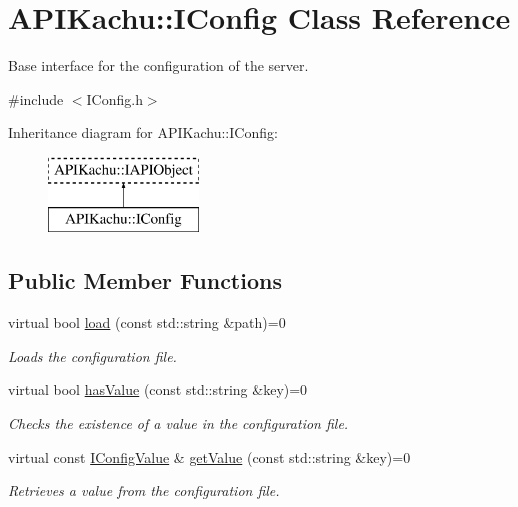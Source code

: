 \hypertarget{class_a_p_i_kachu_1_1_i_config}{}\section{A\+P\+I\+Kachu\+:\+:I\+Config Class Reference}
\label{class_a_p_i_kachu_1_1_i_config}


Base interface for the configuration of the server.  




{\ttfamily \#include $<$I\+Config.\+h$>$}

Inheritance diagram for A\+P\+I\+Kachu\+:\+:I\+Config\+:\begin{figure}[H]
\begin{center}
\leavevmode
\includegraphics[height=2.000000cm]{class_a_p_i_kachu_1_1_i_config}
\end{center}
\end{figure}
\subsection*{Public Member Functions}
\begin{DoxyCompactItemize}
\item 
virtual bool \hyperlink{class_a_p_i_kachu_1_1_i_config_a117be9b809a9ef2b8bb5ad6834cf2c89}{load} (const std\+::string \&path)=0
\begin{DoxyCompactList}\small\item\em Loads the configuration file. \end{DoxyCompactList}\item 
virtual bool \hyperlink{class_a_p_i_kachu_1_1_i_config_afec3895b88c9f42c1a8e4bf4a79d64cc}{has\+Value} (const std\+::string \&key)=0
\begin{DoxyCompactList}\small\item\em Checks the existence of a value in the configuration file. \end{DoxyCompactList}\item 
virtual const \hyperlink{class_a_p_i_kachu_1_1_i_config_value}{I\+Config\+Value} \& \hyperlink{class_a_p_i_kachu_1_1_i_config_a1dd2e1023713d6720746d0b02de301c8}{get\+Value} (const std\+::string \&key)=0
\begin{DoxyCompactList}\small\item\em Retrieves a value from the configuration file. \end{DoxyCompactList}\end{DoxyCompactItemize}


